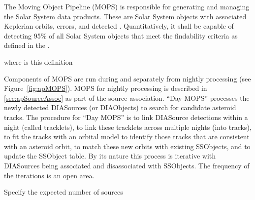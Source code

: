 The Moving Object Pipeline (MOPS) is responsible for generating and managing the Solar System data products. These are Solar System objects with associated Keplerian orbits, errors, and detected \DIASources. Quantitatively, it shall be capable of detecting 95\% of all Solar System objects that meet the findability criteria as defined in the \OSS\@. 
\begin{note} where is this definition \end{note}

Components of MOPS are run during and separately from nightly processing (see Figure~\ref{fig:apMOPS}). MOPS for nightly processing is described in \ref{sec:apSourceAssoc} as part of the source association. ``Day MOPS'' processes the newly detected DIASources (or DIAObjects) to search for candidate asteroid tracks. The procedure for ``Day MOPS'' is to link DIASource detections within a night (called tracklets), to link these tracklets across multiple nights (into tracks), to fit the tracks with an orbital model to identify those tracks that are consistent with an asteroid orbit, to match these new orbits with existing SSObjects, and to update the SSObject table. By its nature this process is iterative with DIASources being associated and disassociated with SSObjects. The frequency of the iterations is an open area.

\begin{note} Specify the expected number of sources \end{note}

